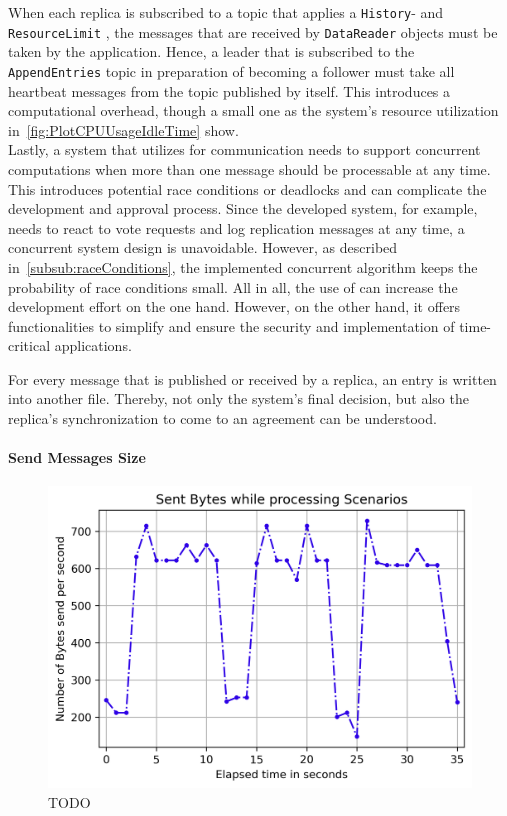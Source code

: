 When each replica is subscribed to a topic that applies a \texttt{History}- and \texttt{ResourceLimit} , the messages that are received by \texttt{DataReader} objects must be taken by the application.
Hence, a leader that is subscribed to the \texttt{AppendEntries} topic in preparation of becoming a follower must take all heartbeat messages from the topic published by itself.
This introduces a computational overhead, though a small one as the system's resource utilization in~\autoref{fig:PlotCPUUsageIdleTime} show.
\\

Lastly, a system that utilizes  for communication needs to support concurrent computations when more than one message should be processable at any time.
This introduces potential race conditions or deadlocks and can complicate the development and approval process.
Since the developed system, for example, needs to react to vote requests and log replication messages at any time, a concurrent system design is unavoidable.
However, as described in~\autoref{subsub:raceConditions}, the implemented concurrent algorithm keeps the probability of race conditions small.
All in all, the use of  can increase the development effort on the one hand. However, on the other hand, it offers functionalities to simplify and ensure the security and implementation of time-critical applications.



\iffalse


For every message that is published or received by a replica, an entry is written into another file.
Thereby, not only the system's final decision, but also the replica's synchronization to come to an agreement can be understood.

\paragraph{Send Messages Size}
\begin{figure}[!htb]
	\centering
	\includegraphics[width=0.75\linewidth]{images/plots/scenarioProcessingMessageSize}
	\caption{TODO}
	\label{fig:messageSizeScenarioProcessing}
\end{figure}


